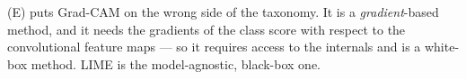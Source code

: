 \documentclass[11pt]{exam}
\begin{document}
\begin{questions}
\begin{solution}
  (E) puts Grad-CAM on the wrong side of the taxonomy. It is a \emph{gradient}-based method, and it
  needs the gradients of the class score with respect to the convolutional feature maps --- so it
  requires access to the internals and is a white-box method. LIME is the model-agnostic,
  black-box one.
\end{solution}

\end{questions}
\end{document}
